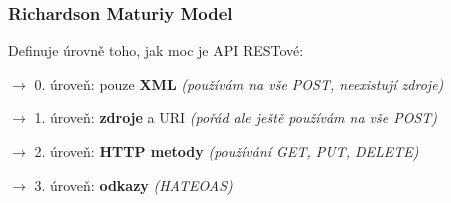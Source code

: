 \subsubsection*{Richardson Maturiy Model}

Definuje úrovně toho, jak moc je API RESTové:

\vspace{2pt}

 $\to$ 0. úroveň: pouze \textbf{XML} \textit{(používám na vše POST, neexistují zdroje)}

 $\to$ 1. úroveň: \textbf{zdroje} a URI \textit{(pořád ale ještě používám na vše POST)}

 $\to$ 2. úroveň: \textbf{HTTP metody} \textit{(používání GET, PUT, DELETE)}

 $\to$ 3. úroveň: \textbf{odkazy} \textit{(HATEOAS)}
